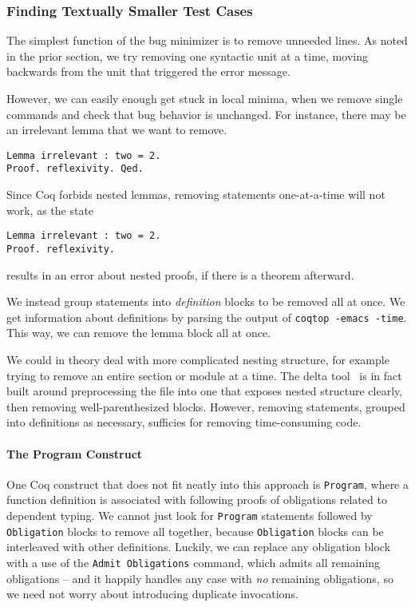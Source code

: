 \documentclass[a4paper,USenglish,cleveref,autoref,thm-restate]{lipics-v2021}
\begin{document}
\subsubsection{Finding Textually Smaller Test Cases}

The simplest function of the bug minimizer is to remove unneeded lines.
As noted in the prior section, we try removing one syntactic unit at a time, moving backwards from the unit that triggered the error message.

However, we can easily enough get stuck in local minima, when we remove single commands and check that bug behavior is unchanged.
For instance, there may be an irrelevant lemma that we want to remove.
\begin{verbatim}
Lemma irrelevant : two = 2.
Proof. reflexivity. Qed.
\end{verbatim}
Since Coq forbids nested lemmas, removing statements one-at-a-time will not work, as the state
\begin{verbatim}
Lemma irrelevant : two = 2.
Proof. reflexivity.
\end{verbatim}
results in an error about nested proofs, if there is a theorem afterward.

We instead group statements into \emph{definition} blocks to be removed all at once.
We get information about definitions by parsing the output of \texttt{coqtop -emacs -time}.
This way, we can remove the lemma block all at once.

We could in theory deal with more complicated nesting structure, for example trying to remove an entire section or module at a time.
The delta tool~\cite{delta} is in fact built around preprocessing the file into one that exposes nested structure clearly, then removing well-parenthesized blocks.
However, removing statements, grouped into definitions as necessary, sufficies for removing time-consuming code.

\paragraph{The Program Construct}
One Coq construct that does not fit neatly into this approach is \verb|Program|, where a function definition is associated with following proofs of obligations related to dependent typing.
We cannot just look for \verb|Program| statements followed by \verb|Obligation| blocks to remove all together, because \verb|Obligation| blocks can be interleaved with other definitions.
Luckily, we can replace any obligation block with a use of the \verb|Admit Obligations| command, which admits all remaining obligations -- and it happily handles any case with \emph{no} remaining obligations, so we need not worry about introducing duplicate invocations.
\end{document}
